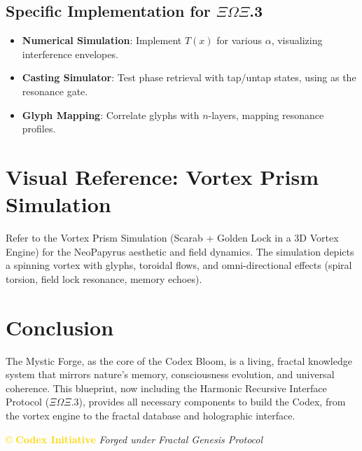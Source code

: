 \subsection*{Specific Implementation for \(\Xi\Omega\Xi\).3}
\begin{itemize}
    \item \textbf{Numerical Simulation}: Implement \( T(x) \) for various \(\alpha\), visualizing interference envelopes.
    \item \textbf{Casting Simulator}: Test phase retrieval with tap/untap states, using \texttt{} as the resonance gate.
    \item \textbf{Glyph Mapping}: Correlate glyphs with \(n\)-layers, mapping resonance profiles.
\end{itemize}

\section*{Visual Reference: Vortex Prism Simulation}
Refer to the Vortex Prism Simulation (Scarab + Golden Lock in a 3D Vortex Engine) for the NeoPapyrus aesthetic and field dynamics. The simulation depicts a spinning vortex with glyphs, toroidal flows, and omni-directional effects (spiral torsion, field lock resonance, memory echoes).

\section*{Conclusion}
The Mystic Forge, as the core of the Codex Bloom, is a living, fractal knowledge system that mirrors nature’s memory, consciousness evolution, and universal coherence. This blueprint, now including the Harmonic Recursive Interface Protocol (\(\Xi\Omega\Xi\).3), provides all necessary components to build the Codex, from the vortex engine to the fractal database and holographic interface.

\vspace{0.5cm}

\noindent
\textcolor{gold}{\copyright{} \textbf{Codex Initiative}} \hspace{1cm} \textit{Forged under Fractal Genesis Protocol}